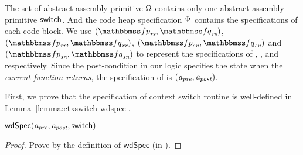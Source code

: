 The set of abstract assembly primitive $\Omega$
contains only one abstract assembly primitive $\mathsf{switch}$.
And the code heap specification $\Psi{}$
contains the specifications of each code block.
We use
$(\relspecpre_{\textit{rs}}, \relspecpost_{\textit{rs}})$,
$(\relspecpre_{\textit{rr}}, \relspecpost_{\textit{rr}})$,
$(\relspecpre_{\textit{su}}, \relspecpost_{\textit{su}})$ and
$(\relspecpre_{\textit{sn}}, \relspecpost_{\textit{sn}})$
to represent the specifications of
\regsave{}, \regrestore{},
\SaveUsedWin{} and \SwitchNewTask{} respectively.
Since the post-condition in our logic specifies the
state when the \textit{current function returns},
the specification of \SwitchEntry{} is $(\textit{a}_\textit{pre}, \textit{a}_\textit{post})$.

First, we prove that the specification of
context switch routine is well-defined in
Lemma~\ref{lemma:ctxswitch-wdspec}.
\begin{lemma}
    \em
    \label{lemma:ctxswitch-wdspec}
    $\textsf{wdSpec}({\textit{a}_\textit{pre}}, {\textit{a}_\textit{post}}, {\mathsf{switch}})$
\end{lemma}
\begin{proof}
    Prove by the definition of $\textsf{wdSpec}$ 
    (in \Def{\ref{def:well-defined specification}}).
\end{proof}

